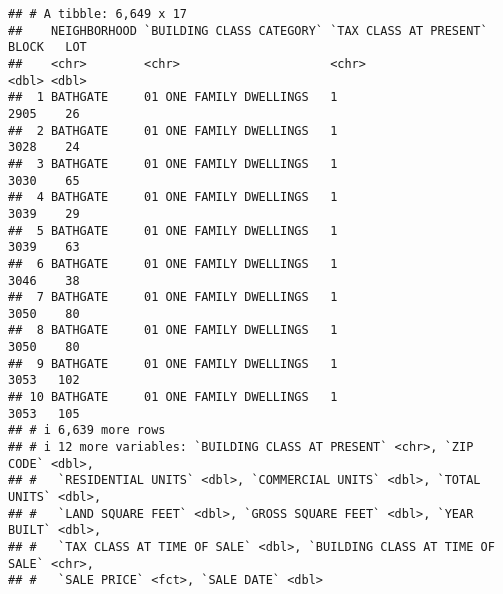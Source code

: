 \documentclass[
]{article}
\newenvironment{Shaded}{\begin{snugshade}}{\end{snugshade}}
\newcommand{\AttributeTok}[1]{\textcolor[rgb]{0.77,0.63,0.00}{#1}}
\newcommand{\CommentTok}[1]{\textcolor[rgb]{0.56,0.35,0.01}{\textit{#1}}}
\newcommand{\DecValTok}[1]{\textcolor[rgb]{0.00,0.00,0.81}{#1}}
\newcommand{\FunctionTok}[1]{\textcolor[rgb]{0.00,0.00,0.00}{#1}}
\newcommand{\NormalTok}[1]{#1}
\newcommand{\OtherTok}[1]{\textcolor[rgb]{0.56,0.35,0.01}{#1}}
\newcommand{\SpecialCharTok}[1]{\textcolor[rgb]{0.00,0.00,0.00}{#1}}
\newcommand{\StringTok}[1]{\textcolor[rgb]{0.31,0.60,0.02}{#1}}
\begin{document}
\begin{Shaded}
\end{Shaded}

\begin{verbatim}
## # A tibble: 6,649 x 17
##    NEIGHBORHOOD `BUILDING CLASS CATEGORY` `TAX CLASS AT PRESENT` BLOCK   LOT
##    <chr>        <chr>                     <chr>                  <dbl> <dbl>
##  1 BATHGATE     01 ONE FAMILY DWELLINGS   1                       2905    26
##  2 BATHGATE     01 ONE FAMILY DWELLINGS   1                       3028    24
##  3 BATHGATE     01 ONE FAMILY DWELLINGS   1                       3030    65
##  4 BATHGATE     01 ONE FAMILY DWELLINGS   1                       3039    29
##  5 BATHGATE     01 ONE FAMILY DWELLINGS   1                       3039    63
##  6 BATHGATE     01 ONE FAMILY DWELLINGS   1                       3046    38
##  7 BATHGATE     01 ONE FAMILY DWELLINGS   1                       3050    80
##  8 BATHGATE     01 ONE FAMILY DWELLINGS   1                       3050    80
##  9 BATHGATE     01 ONE FAMILY DWELLINGS   1                       3053   102
## 10 BATHGATE     01 ONE FAMILY DWELLINGS   1                       3053   105
## # i 6,639 more rows
## # i 12 more variables: `BUILDING CLASS AT PRESENT` <chr>, `ZIP CODE` <dbl>,
## #   `RESIDENTIAL UNITS` <dbl>, `COMMERCIAL UNITS` <dbl>, `TOTAL UNITS` <dbl>,
## #   `LAND SQUARE FEET` <dbl>, `GROSS SQUARE FEET` <dbl>, `YEAR BUILT` <dbl>,
## #   `TAX CLASS AT TIME OF SALE` <dbl>, `BUILDING CLASS AT TIME OF SALE` <chr>,
## #   `SALE PRICE` <fct>, `SALE DATE` <dbl>
\end{verbatim}
\end{document}
